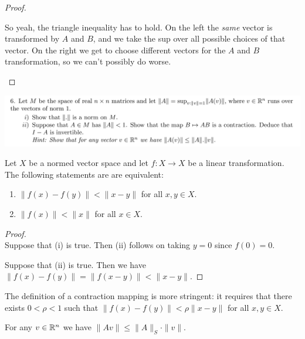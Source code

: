\documentclass[12pt]{article}
\begin{document}
\begin{enumerate}[label=(\roman*)]
\begin{proof}
\begin{enumerate}
      So yeah, the triangle inequality has to hold. On the left the {\it same} vector is
      transformed by $A$ and $B$, and we take the sup over all possible choices of that vector. On
      the right we get to choose different vectors for the $A$ and $B$ transformation, so we can't
      possibly do worse.

    \end{enumerate}
  \end{proof}


  \newpage


  \begin{mdframed}
    \includegraphics[width=400pt]{img/oxford-a2-2-6.png}
  \end{mdframed}

  \begin{lemma}\label{a2-2-6-lemma-1}
    Let $X$ be a normed vector space and let $f:X \to X$ be a linear transformation. The following
    statements are are equivalent:
    \begin{enumerate}[label=(\roman*)]
    \item $\|f(x) - f(y)\| < \|x - y\|$ for all $x, y \in X$.
    \item $\|f(x)\| < \|x\|$ for all $x \in X$.
    \end{enumerate}
  \end{lemma}

  \begin{proof}~\\
    Suppose that (i) is true. Then (ii) follows on taking $y = 0$ since $f(0) = 0$.

    Suppose that (ii) is true. Then we have $\|f(x) - f(y)\| = \|f(x - y)\| < \|x - y\|$.
  \end{proof}

  \begin{remark*}
    The definition of a contraction mapping is more stringent: it requires that there exists
    $0 < \rho < 1$ such that $\|f(x) - f(y)\| < \rho\|x - y\|$ for all $x, y \in X$.
  \end{remark*}

  \begin{lemma}\label{a2-2-6-lemma-2}
    For any $v \in \mathbb{R}^n$ we have $\|Av\| \leq \|A\|_S \cdot \|v\|$.
  \end{lemma}


\end{enumerate}
\end{document}
